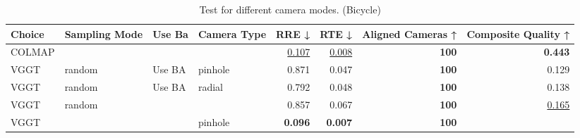 \begin{table}[H]
\caption{Test for different camera modes. (Bicycle)}
\label{tab:99_camera_modes_bicycle}
\begin{tabular}{llllrrrr}
\toprule
Choice & Sampling Mode & Use Ba & Camera Type & RRE ↓ & RTE ↓ & Aligned Cameras ↑ & Composite Quality ↑ \\
\midrule
COLMAP &  &  &  & \underline{0.107} & \underline{0.008} & \textbf{100} & \textbf{0.443} \\
VGGT & random & Use BA & pinhole & 0.871 & 0.047 & \textbf{100} & 0.129 \\
VGGT & random & Use BA & radial & 0.792 & 0.048 & \textbf{100} & 0.138 \\
VGGT & random &  &  & 0.857 & 0.067 & \textbf{100} & \underline{0.165} \\
VGGT &  &  & pinhole & \textbf{0.096} & \textbf{0.007} & \textbf{100} &  \\
\bottomrule
\end{tabular}
\end{table}
